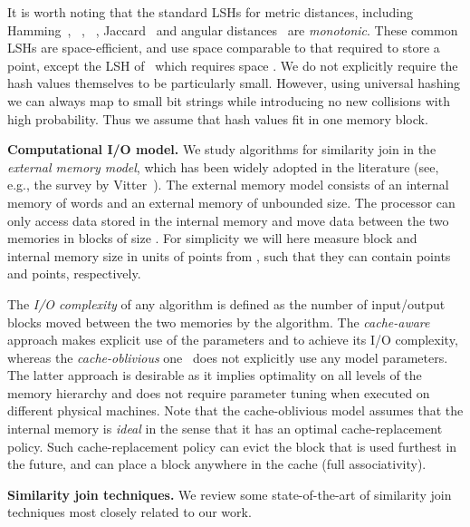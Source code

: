 \documentclass{llncs}
\begin{document}
It is worth noting that the standard LSHs for metric distances, including Hamming~\cite{Indyk_STOC98}, ~\cite{Datar_SOCG04}, ~\cite{Andoni_FOCS06,Datar_SOCG04}, Jaccard~\cite{Broder_NETWORK97} and angular distances~\cite{Charikar_STOC02} are \textit{monotonic}. 
These common LSHs are space-efficient, and use space comparable to that required to store a point, except the LSH of~\cite{Andoni_FOCS06} which requires space .
We do not explicitly require the hash values themselves to be particularly small.
However, using universal hashing we can always map to small bit strings while introducing no new collisions with high probability. 
Thus we assume that  hash values fit in one memory block.








\smallskip

\textbf{Computational I/O model.}
We study algorithms for similarity join in the \emph{external memory model}, which has been widely adopted in the literature (see, e.g., the survey by
Vitter~\cite{Vitter08}).
The external memory model consists of an internal memory of  words and an external memory of unbounded size. 
The processor can only access data stored in the internal memory and move data between the two memories in blocks of size .
For simplicity we will here measure block and internal memory size in units of points from , such that they can contain  points and  points, respectively.

The \emph{I/O complexity} of any algorithm is defined as the number of input/output blocks moved between the two memories by the algorithm. 
The \emph{cache-aware} approach makes explicit use of the parameters  and   to achieve its I/O complexity, whereas the \textit{cache-oblivious} one~\cite{frigo1999cache} does not explicitly use any model parameters. 
The latter approach is desirable as it implies optimality on all levels of the memory hierarchy and does not require parameter tuning when executed on different physical machines. 
Note that the cache-oblivious model assumes that the internal memory is \emph{ideal} in the sense that it has an optimal cache-replacement policy. Such cache-replacement policy can evict the block that is used furthest in the future, and can place a block anywhere in the cache (full associativity). 



\smallskip

\textbf{Similarity join techniques.}
We review some state-of-the-art of similarity join techniques most closely related to our work.
\end{document}
